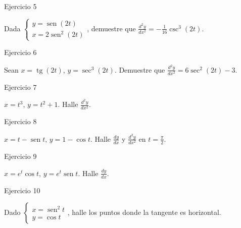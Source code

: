 \documentclass[aspectratio=169]{beamer}
\begin{document}
\begin{frame}{Ejercicio 5}
  \begin{mwejercicio}
    Dada $\begin{cases} y = \operatorname{sen}(2t) \\ x = 2\operatorname{sen}^2(2t) \end{cases}$, demuestre que $\frac{d^2y}{dx^2} = -\frac{1}{16}\csc^3(2t)$.
  \end{mwejercicio}
\end{frame}

\begin{frame}{Ejercicio 6}
  \begin{mwejercicio}
    Sean $x = \operatorname{tg}(2t)$, $y = \sec^3(2t)$. Demuestre que $\frac{d^2y}{dx^2} = 6\sec^2(2t) - 3$.
  \end{mwejercicio}
\end{frame}

\begin{frame}{Ejercicio 7}
  \begin{mwejercicio}
    $x = t^3$, $y = t^2 + 1$. Halle $\frac{d^2y}{dx^2}$.
  \end{mwejercicio}
\end{frame}

\begin{frame}{Ejercicio 8}
  \begin{mwejercicio}
    $x = t - \operatorname{sen} t$, $y = 1 - \cos t$. Halle $\frac{dy}{dx}$ y $\frac{d^2y}{dx^2}$ en $t = \frac{\pi}{2}$.
  \end{mwejercicio}
\end{frame}

\begin{frame}{Ejercicio 9}
  \begin{mwejercicio}
    $x = e^t\cos t$, $y = e^t\operatorname{sen} t$. Halle $\frac{dy}{dx}$.
  \end{mwejercicio}
\end{frame}

\begin{frame}{Ejercicio 10}
  \begin{mwejercicio}
    Dado $\begin{cases} x = \operatorname{sen}^2 t \\ y = \cos t \end{cases}$, halle los puntos donde la tangente es horizontal.
  \end{mwejercicio}
\end{frame}
\end{document}
